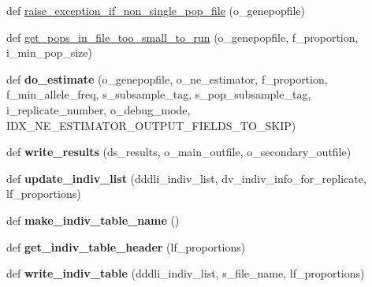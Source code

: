 \begin{DoxyCompactItemize}
\item 
def \hyperlink{namespacenegui_1_1pgdriveneestimator_ac98833013f11d6aa3544b0fc60951632}{raise\+\_\+exception\+\_\+if\+\_\+non\+\_\+single\+\_\+pop\+\_\+file} (o\+\_\+genepopfile)
\item 
def \hyperlink{namespacenegui_1_1pgdriveneestimator_a8255cfe046e2bbb517ee9834d626c021}{get\+\_\+pops\+\_\+in\+\_\+file\+\_\+too\+\_\+small\+\_\+to\+\_\+run} (o\+\_\+genepopfile, f\+\_\+proportion, i\+\_\+min\+\_\+pop\+\_\+size)
\item 
def {\bfseries do\+\_\+estimate} (o\+\_\+genepopfile, o\+\_\+ne\+\_\+estimator, f\+\_\+proportion, f\+\_\+min\+\_\+allele\+\_\+freq, s\+\_\+subsample\+\_\+tag, s\+\_\+pop\+\_\+subsample\+\_\+tag, i\+\_\+replicate\+\_\+number, o\+\_\+debug\+\_\+mode, I\+D\+X\+\_\+\+N\+E\+\_\+\+E\+S\+T\+I\+M\+A\+T\+O\+R\+\_\+\+O\+U\+T\+P\+U\+T\+\_\+\+F\+I\+E\+L\+D\+S\+\_\+\+T\+O\+\_\+\+S\+K\+IP)\hypertarget{namespacenegui_1_1pgdriveneestimator_a96ed6f3a776d97ee0f62d42eaeb344b6}{}\label{namespacenegui_1_1pgdriveneestimator_a96ed6f3a776d97ee0f62d42eaeb344b6}

\item 
def {\bfseries write\+\_\+results} (ds\+\_\+results, o\+\_\+main\+\_\+outfile, o\+\_\+secondary\+\_\+outfile)\hypertarget{namespacenegui_1_1pgdriveneestimator_a97bd4891f7343e405094bdf307c7ee89}{}\label{namespacenegui_1_1pgdriveneestimator_a97bd4891f7343e405094bdf307c7ee89}

\item 
def {\bfseries update\+\_\+indiv\+\_\+list} (dddli\+\_\+indiv\+\_\+list, dv\+\_\+indiv\+\_\+info\+\_\+for\+\_\+replicate, lf\+\_\+proportions)\hypertarget{namespacenegui_1_1pgdriveneestimator_a13125786920acfc0de2b28feadb33d52}{}\label{namespacenegui_1_1pgdriveneestimator_a13125786920acfc0de2b28feadb33d52}

\item 
def {\bfseries make\+\_\+indiv\+\_\+table\+\_\+name} ()\hypertarget{namespacenegui_1_1pgdriveneestimator_aba42585f01bf9ed8468c043e7f05e56a}{}\label{namespacenegui_1_1pgdriveneestimator_aba42585f01bf9ed8468c043e7f05e56a}

\item 
def {\bfseries get\+\_\+indiv\+\_\+table\+\_\+header} (lf\+\_\+proportions)\hypertarget{namespacenegui_1_1pgdriveneestimator_a8ea31f316844b96fb9ba5d9985b16ecc}{}\label{namespacenegui_1_1pgdriveneestimator_a8ea31f316844b96fb9ba5d9985b16ecc}

\item 
def {\bfseries write\+\_\+indiv\+\_\+table} (dddli\+\_\+indiv\+\_\+list, s\+\_\+file\+\_\+name, lf\+\_\+proportions)\hypertarget{namespacenegui_1_1pgdriveneestimator_aafa226c9f86340bb646ac850410d315c}{}\label{namespacenegui_1_1pgdriveneestimator_aafa226c9f86340bb646ac850410d315c}


\end{DoxyCompactItemize}
